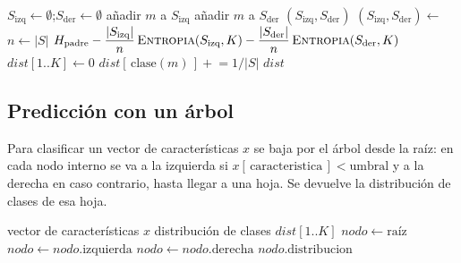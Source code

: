 \documentclass[11pt,a4paper]{article}
\begin{document}
\begin{algorithm}[h]
\caption{Reparto de muestras y ganancia de información}
\begin{algorithmic}[1]
  \State $S_{\text{izq}} \gets \emptyset$;\quad $S_{\text{der}} \gets \emptyset$
        \State añadir $m$ a $S_{\text{izq}}$
     \Else
        \State añadir $m$ a $S_{\text{der}}$
     \EndIf
  \EndFor
  \State \Return $(S_{\text{izq}}, S_{\text{der}})$
\EndFunction
\Statex
{}
  \State $(S_{\text{izq}}, S_{\text{der}}) \gets$ 
  \State $n \gets |S|$
  \State \Return $H_{\text{padre}}
        - \dfrac{|S_{\text{izq}}|}{n}\,\Call{Entropia}{S_{\text{izq}}, K}
        - \dfrac{|S_{\text{der}}|}{n}\,\Call{Entropia}{S_{\text{der}}, K}$
\EndFunction
\Statex
{}
  \State $\mathit{dist}[1..K] \gets 0$
     \State $\mathit{dist}[\,\text{clase}(m)\,] \mathrel{+}= 1 / |S|$
  \EndFor
  \State \Return $\mathit{dist}$
\EndFunction
\end{algorithmic}
\end{algorithm}

\subsection{Predicción con un árbol}

Para clasificar un vector de características $x$ se baja por el árbol desde la raíz: en cada
nodo interno se va a la izquierda si $x[\,\text{caracteristica}\,] < \text{umbral}$ y a la
derecha en caso contrario, hasta llegar a una hoja. Se devuelve la distribución de clases de
esa hoja.

\begin{algorithm}[h]
\caption{Predicción de un árbol}
\begin{algorithmic}[1]
  \Require vector de características $x$
  \Ensure distribución de clases $\mathit{dist}[1..K]$
  \State $\mathit{nodo} \gets \text{raíz}$
        \State $\mathit{nodo} \gets \mathit{nodo}.\text{izquierda}$
     \Else
        \State $\mathit{nodo} \gets \mathit{nodo}.\text{derecha}$
     \EndIf
  \EndWhile
  \State \Return $\mathit{nodo}.\text{distribucion}$
\EndFunction
\end{algorithmic}
\end{algorithm}
\end{document}
